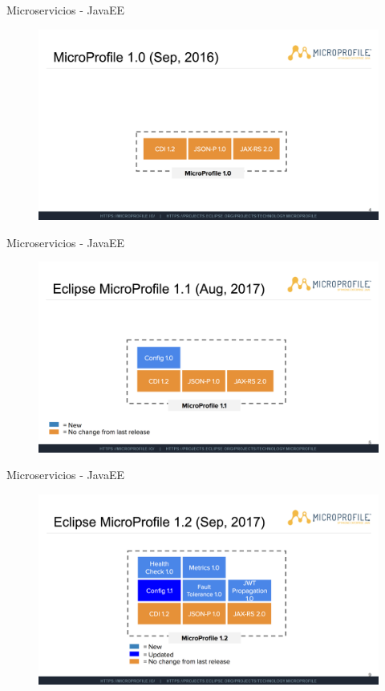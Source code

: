 \documentclass{beamer}
\begin{document}
\begin{frame}{Microservicios - JavaEE}
\begin{figure}
	\centering
	\includegraphics[width=\linewidth]{Images/mp1}
\end{figure}
\end{frame}

\begin{frame}{Microservicios - JavaEE}
\begin{figure}
	\centering
	\includegraphics[width=\linewidth]{Images/mp2}
\end{figure}
\end{frame}

\begin{frame}{Microservicios - JavaEE}
\begin{figure}
	\centering
	\includegraphics[width=\linewidth]{Images/mp3}
\end{figure}
\end{frame}
\end{document}
